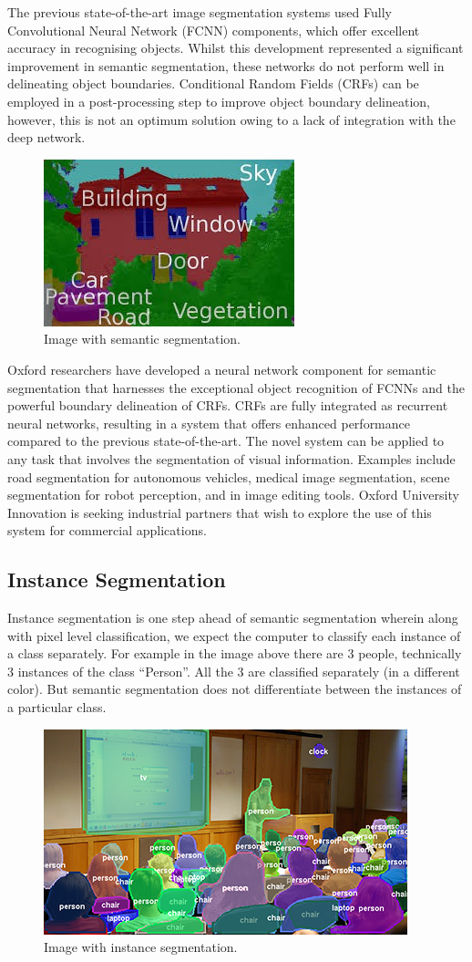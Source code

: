 The previous state-of-the-art image segmentation systems used Fully Convolutional Neural Network (FCNN) components, which offer excellent accuracy in recognising objects. Whilst this development represented a significant improvement in semantic segmentation, these networks do not perform well in delineating object boundaries. Conditional Random Fields (CRFs) can be employed in a post-processing step to improve object boundary delineation, however, this is not an optimum solution owing to a lack of integration with the deep network.
\begin{figure}
  \centering
  \includegraphics[width=0.5\linewidth]{images/semantic.jpg}
   \caption{Image with semantic segmentation.}
\end{figure}
Oxford researchers have developed a neural network component for semantic segmentation that harnesses the exceptional object recognition of FCNNs and the powerful boundary delineation of CRFs. CRFs are fully integrated as recurrent neural networks, resulting in a system that offers enhanced performance compared to the previous state-of-the-art. The novel system can be applied to any task that involves the segmentation of visual information. Examples include road segmentation for autonomous vehicles, medical image segmentation, scene segmentation for robot perception, and in image editing tools. Oxford University Innovation is seeking industrial partners that wish to explore the use of this system for commercial applications.
\subsection{
Instance Segmentation
}
Instance segmentation is one step ahead of semantic segmentation wherein along with pixel level classification, we expect the computer to classify each instance of a class separately. For example in the image above there are 3 people, technically 3 instances of the class “Person”. All the 3 are classified separately (in a different color). But semantic segmentation does not differentiate between the instances of a particular class.
\begin{figure}
  \centering
  \includegraphics[width=0.5\linewidth]{images/instance.png}
   \caption{Image with instance segmentation.}
\end{figure}

